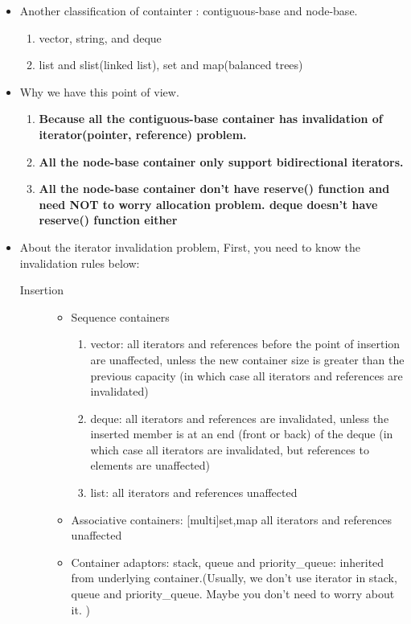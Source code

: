 \documentclass[a4paper,12pt,twoside]{book}
\begin{document}
\begin{itemize}
\item Another classification of containter : contiguous-base and node-base.
\begin{enumerate}
\item vector, string, and deque
\item list and slist(linked list), set and map(balanced trees)
\end{enumerate}

\item Why we have this point of view.
\begin{enumerate}
\item \textbf{Because all the contiguous-base container has invalidation of iterator(pointer, reference) problem. }
\item \textbf{All the node-base container only support bidirectional iterators. }
\item \textbf{All the node-base container don't have reserve() function and need NOT to worry allocation problem. deque doesn't have reserve() function either }
\end{enumerate}

\item About the iterator invalidation problem,  First, you need to know the invalidation rules below:
\begin{description}
\item[Insertion]
\begin{itemize}
\item Sequence containers
		\begin{enumerate}
		\item vector: all iterators and references before the point of insertion are unaffected, unless the new container size is greater than the previous capacity (in which case all iterators and references are invalidated)
		\item deque: all iterators and references are invalidated, unless the inserted member is at an end (front or back) of the deque (in which case all iterators are invalidated, but references to elements are unaffected)
		\item list: all iterators and references unaffected
		\end{enumerate}

\item Associative containers: [multi]{set,map} all iterators and references unaffected

\item Container adaptors:  stack, queue and priority\_queue: inherited from underlying container.(Usually, we don't use iterator in stack, queue and priority\_queue. Maybe you don't need to worry about it. )
\end{itemize}


\end{description}
\end{itemize}
\end{document}
